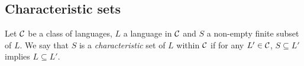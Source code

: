 \subsection{Characteristic sets}\label{subsec:charsets}



\begin{dfn}
    Let $\mathcal{C}$ be a class of languages, $L$ a language in $\mathcal{C}$ and
    $S$ a non-empty finite subset of $L$.
    We say that $S$ is a \textit{characteristic} set of $L$ within $\mathcal{C}$
    if for any $L' \in \mathcal{C}$,
    $S \subseteq L'$ implies $L \subseteq L'$.
\end{dfn}

